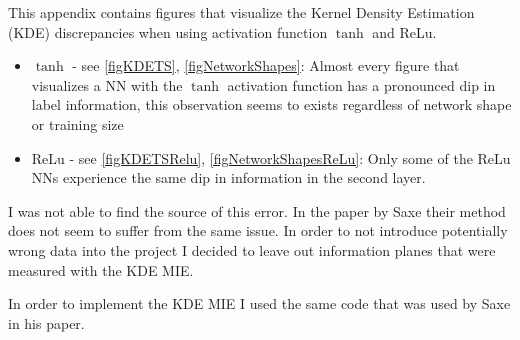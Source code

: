 \documentclass[dissertation.tex]{subfiles}
\begin{document}
This appendix contains figures that visualize the Kernel Density Estimation
(KDE) discrepancies when using activation function $\tanh$ and ReLu.
\begin{itemize}
  \item{
      $\tanh$ - see \autoref{figKDETS}, \autoref{figNetworkShapes}: Almost every
      figure that visualizes a NN with the $\tanh$ activation function has a
      pronounced dip in label information, this observation seems to exists
      regardless of network shape or training size
    }
  \item{
      ReLu - see \autoref{figKDETSRelu}, \autoref{figNetworkShapesReLu}: Only
      some of the ReLu NNs experience the same dip in information in the second
      layer.
    }
\end{itemize}
I was not able to find the source of this error. In the paper by Saxe their
method does not seem to suffer from the same issue. In order to not introduce
potentially wrong data into the project I decided to leave out information
planes that were measured with the KDE MIE.

In order to implement the KDE MIE I used the same code that was used by Saxe in
his paper.
\end{document}
